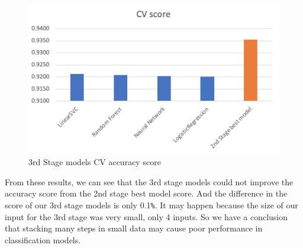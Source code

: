     \begin{figure}[htbp]
        \centering
        \includegraphics[scale=0.6]{./Figure/3rdstage.png}
        \caption{3rd Stage models CV accuracy score}
        \label{fig:3rdstage}
      \end{figure}

From these results, we can see that the 3rd stage models could not improve the accuracy score from the 2nd stage best model score. And the difference in the score of our 3rd stage models is only 0.1\verb+%+. It may happen because the size of our input for the 3rd stage was very small, only 4 inputs. So we have a conclusion that stacking many steps in small data may cause poor performance in classification models.


